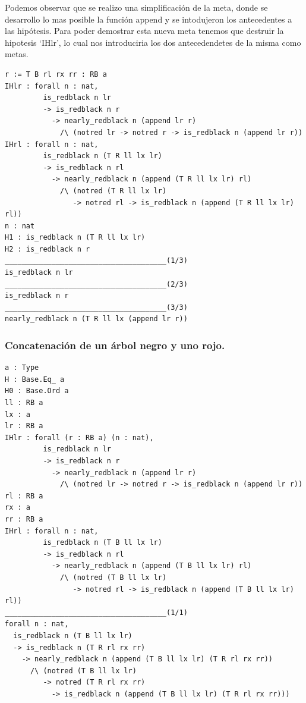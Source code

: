 \documentclass[8pt,leqno,pdflatex,spanish]{book}
\theoremstyle{plain}
\theoremstyle{definition}
\theoremstyle{remark}
\begin{document}
Podemos observar que se realizo una simplificaci\'on de la meta, donde se desarrollo lo mas
posible la funci\'on append y se intodujeron los antecedentes a las hip\'otesis. Para poder 
demostrar esta nueva meta tenemos que destruir la hipotesis `IHlr', lo cual nos introduciria los 
dos antecedendetes de la misma como metas.

\begin{verbatim}
r := T B rl rx rr : RB a
IHlr : forall n : nat,
         is_redblack n lr
         -> is_redblack n r
           -> nearly_redblack n (append lr r)
             /\ (notred lr -> notred r -> is_redblack n (append lr r))
IHrl : forall n : nat,
         is_redblack n (T R ll lx lr)
         -> is_redblack n rl
           -> nearly_redblack n (append (T R ll lx lr) rl)
             /\ (notred (T R ll lx lr)
                -> notred rl -> is_redblack n (append (T R ll lx lr) rl))
n : nat
H1 : is_redblack n (T R ll lx lr)
H2 : is_redblack n r
______________________________________(1/3)
is_redblack n lr
______________________________________(2/3)
is_redblack n r
______________________________________(3/3)
nearly_redblack n (T R ll lx (append lr r))
\end{verbatim}



\subsubsection{Concatenaci\'on de un \'arbol negro y uno rojo.} 
\begin{verbatim}
a : Type
H : Base.Eq_ a
H0 : Base.Ord a
ll : RB a
lx : a
lr : RB a
IHlr : forall (r : RB a) (n : nat),
         is_redblack n lr
         -> is_redblack n r
           -> nearly_redblack n (append lr r)
             /\ (notred lr -> notred r -> is_redblack n (append lr r))
rl : RB a
rx : a
rr : RB a
IHrl : forall n : nat,
         is_redblack n (T B ll lx lr)
         -> is_redblack n rl
           -> nearly_redblack n (append (T B ll lx lr) rl)
             /\ (notred (T B ll lx lr)
                -> notred rl -> is_redblack n (append (T B ll lx lr) rl))
______________________________________(1/1)
forall n : nat,
  is_redblack n (T B ll lx lr)
  -> is_redblack n (T R rl rx rr)
    -> nearly_redblack n (append (T B ll lx lr) (T R rl rx rr))
      /\ (notred (T B ll lx lr)
         -> notred (T R rl rx rr)
           -> is_redblack n (append (T B ll lx lr) (T R rl rx rr)))
\end{verbatim}
\end{document}
